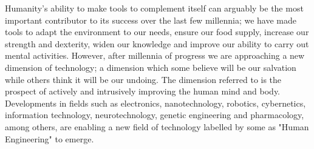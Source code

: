 

Humanity's ability to make tools to complement itself can arguably be the most important contributor to its success over the last few millennia; we have made tools to adapt the environment to our needs, ensure our food supply, increase our strength and dexterity, widen our knowledge and improve our ability to carry out mental activities. However, after millennia of progress we are approaching a new dimension of technology; a dimension which some believe will be our salvation while others think it will be our undoing. The dimension referred to is the prospect of actively and intrusively improving the human mind and body. Developments in fields such as electronics, nanotechnology, robotics, cybernetics, information technology, neurotechnology, genetic engineering and pharmacology, among others, are enabling a new field of technology labelled by some as "Human Engineering" to emerge.

